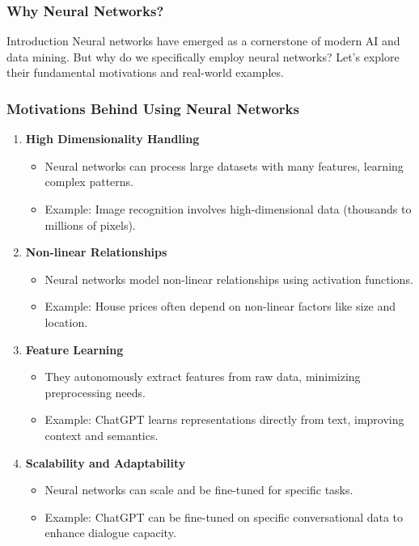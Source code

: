 \documentclass[aspectratio=169]{beamer}
\begin{document}
\begin{frame}[fragile]
    \frametitle{Why Neural Networks?}
    \begin{block}{Introduction}
        Neural networks have emerged as a cornerstone of modern AI and data mining. But why do we specifically employ neural networks? Let’s explore their fundamental motivations and real-world examples.
    \end{block}
\end{frame}

\begin{frame}[fragile]
    \frametitle{Motivations Behind Using Neural Networks}
    \begin{enumerate}
        \item \textbf{High Dimensionality Handling}
            \begin{itemize}
                \item Neural networks can process large datasets with many features, learning complex patterns.
                \item Example: Image recognition involves high-dimensional data (thousands to millions of pixels).
            \end{itemize}

        \item \textbf{Non-linear Relationships}
            \begin{itemize}
                \item Neural networks model non-linear relationships using activation functions.
                \item Example: House prices often depend on non-linear factors like size and location.
            \end{itemize}

        \item \textbf{Feature Learning}
            \begin{itemize}
                \item They autonomously extract features from raw data, minimizing preprocessing needs.
                \item Example: ChatGPT learns representations directly from text, improving context and semantics.
            \end{itemize}

        \item \textbf{Scalability and Adaptability}
            \begin{itemize}
                \item Neural networks can scale and be fine-tuned for specific tasks.
                \item Example: ChatGPT can be fine-tuned on specific conversational data to enhance dialogue capacity.
            \end{itemize}
    \end{enumerate}
\end{frame}
\end{document}
